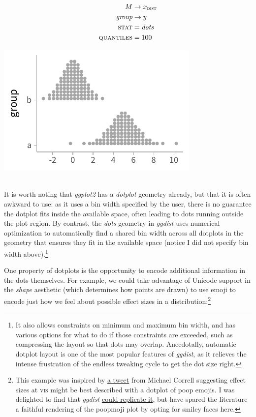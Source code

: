 \documentclass[journal]{vgtc}                     %
\newcommand{\equationfigure}[2]{%
\noindent
\begin{minipage}{.5\columnwidth}
\setlength{\abovedisplayskip}{0pt} %
\setlength{\belowdisplayskip}{0pt} %
#1\end{minipage}%
\begin{minipage}{.4\columnwidth}\centering #2 \end{minipage}%
\vspace{.5\belowdisplayskip}\\
}
\begin{document}
\equationfigure{
\begin{align*}
M &\rightarrow x_\textsc{dist}\\
\textit{group} &\rightarrow y\\
\textsc{stat} &= \mathit{dots}\\
\textsc{quantiles} &= 100
\end{align*}
}{\includegraphics[width=1.2\columnwidth]{figs/3-dots_two.pdf}}
It is worth noting that \textit{ggplot2} has a \textit{dotplot} geometry already, but that it is often awkward to use: as it uses a bin width specified by the user, there is no guarantee the dotplot fits inside the available space, often leading to dots running outside the plot region. By contrast, the \textit{dots} geometry in \textit{ggdist} uses numerical optimization to automatically find a shared bin width across all dotplots in the geometry that ensures they fit in the available space (notice I did not specify bin width above).\footnote{It also allows constraints on minimum and maximum bin width, and has various options for what to do if those constraints are exceeded, such as compressing the layout so that dots may overlap. Anecdotally, automatic dotplot layout is one of the most popular features of \textit{ggdist}, as it relieves the intense frustration of the endless tweaking cycle to get the dot size right.}

One property of dotplots is the opportunity to encode additional information in the dots themselves. For example, we could take advantage of Unicode support in the \textit{shape} aesthetic (which determines how points are drawn) to use emoji to encode just how we feel about possible effect sizes in a distribution:\footnote{This example was inspired by \href{https://twitter.com/Birdbassador/status/916332327696875520}{a tweet} from Michael Correll suggesting effect sizes at \textsc{vis} might be best described with a dotplot of poop emojis. I was delighted to find that \textit{ggdist} \href{https://twitter.com/mjskay/status/1361366253424832512}{could replicate it}, but have spared the literature a faithful rendering of the poopmoji plot by opting for smiley faces here.}
\end{document}
